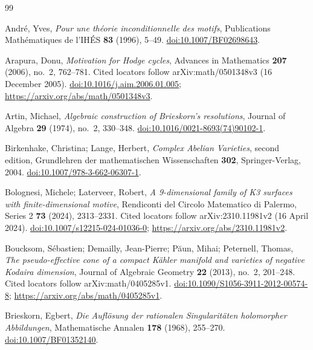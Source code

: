 \documentclass[11pt]{amsart}
\theoremstyle{definition}
\theoremstyle{remark}
\numberwithin{equation}{section}
\begin{document}
\begin{thebibliography}{99}
\raggedright

Andr{\'e}, Yves, \emph{Pour une th{\'e}orie inconditionnelle des motifs}, Publications Math{\'e}matiques de l'IH{\'E}S \textbf{83} (1996), 5--49. \href{https://doi.org/10.1007/BF02698643}{doi:10.1007/BF02698643}.

Arapura, Donu, \emph{Motivation for {Hodge} cycles}, Advances in Mathematics \textbf{207} (2006), no.~2, 762--781. Cited locators follow arXiv:math/0501348v3 (16 December 2005). \href{https://doi.org/10.1016/j.aim.2006.01.005}{doi:10.1016/j.aim.2006.01.005}; \url{https://arxiv.org/abs/math/0501348v3}.

Artin, Michael, \emph{Algebraic construction of {Brieskorn}'s resolutions}, Journal of Algebra \textbf{29} (1974), no.~2, 330--348. \href{https://doi.org/10.1016/0021-8693(74)90102-1}{doi:10.1016/0021-8693(74)90102-1}.

Birkenhake, Christina; Lange, Herbert, \emph{Complex Abelian Varieties}, second edition, Grundlehren der mathematischen Wissenschaften \textbf{302}, Springer-Verlag, 2004. \href{https://doi.org/10.1007/978-3-662-06307-1}{doi:10.1007/978-3-662-06307-1}.

Bolognesi, Michele; Laterveer, Robert, \emph{A 9-dimensional family of {K3} surfaces with finite-dimensional motive}, Rendiconti del Circolo Matematico di Palermo, Series 2 \textbf{73} (2024), 2313--2331. Cited locators follow arXiv:2310.11981v2 (16 April 2024). \href{https://doi.org/10.1007/s12215-024-01036-0}{doi:10.1007/s12215-024-01036-0}; \url{https://arxiv.org/abs/2310.11981v2}.

Boucksom, S{\'e}bastien; Demailly, Jean-Pierre; P{\u a}un, Mihai; Peternell, Thomas, \emph{The pseudo-effective cone of a compact {K{\"a}hler} manifold and varieties of negative {Kodaira} dimension}, Journal of Algebraic Geometry \textbf{22} (2013), no.~2, 201--248. Cited locators follow arXiv:math/0405285v1. \href{https://doi.org/10.1090/S1056-3911-2012-00574-8}{doi:10.1090/S1056-3911-2012-00574-8}; \url{https://arxiv.org/abs/math/0405285v1}.

Brieskorn, Egbert, \emph{Die Aufl{\"o}sung der rationalen Singularit{\"a}ten holomorpher Abbildungen}, Mathematische Annalen \textbf{178} (1968), 255--270. \href{https://doi.org/10.1007/BF01352140}{doi:10.1007/BF01352140}.


\end{thebibliography}
\end{document}
